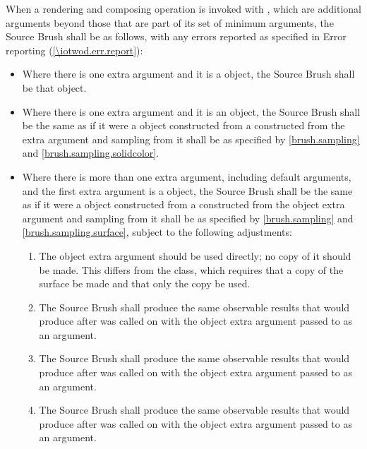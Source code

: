 \pnum
When a rendering and composing operation is invoked with , which are additional arguments beyond those that are part of its set of minimum arguments, the Source Brush shall be as follows, with any errors reported as specified in Error reporting (\ref{\iotwod.err.report}):
\begin{itemize}
	\item Where there is one extra argument and it is a  object, the Source Brush shall be that  object.
	\item Where there is one extra argument and it is an  object, the Source Brush shall be the same as if it were a  object constructed from a  constructed from the extra argument and sampling from it shall be as specified by \ref{brush.sampling} and \ref{brush.sampling.solidcolor}.
	\item Where there is more than one extra argument, including default arguments, and the first extra argument is a  object, the Source Brush shall be the same as if it were a  object  constructed from a  constructed from the  object extra argument and sampling from it shall be as specified by \ref{brush.sampling} and \ref{brush.sampling.surface}, subject to the following adjustments:
	\begin{enumerate}
		\item The  object extra argument should be used directly; no copy of it should be made. This differs from the  class, which requires that a copy of the surface be made and that only the copy be used.
		\item The Source Brush shall produce the same observable results that  would produce after  was called on  with the  object extra argument passed to  as an argument.
		\item The Source Brush shall produce the same observable results that  would produce after  was called on  with the  object extra argument passed to  as an argument.
		\item The Source Brush shall produce the same observable results that  would produce after  was called on  with the  object extra argument passed to  as an argument.
	\end{enumerate}
\end{itemize}

